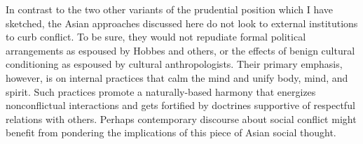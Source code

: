 In contrast to the two other variants of the prudential position which I have sketched, the Asian approaches discussed here do not look to external institutions to curb conflict. To be sure, they would not repudiate formal political arrangements as espoused by Hobbes and others, or the effects of benign cultural conditioning as espoused by cultural anthropologists. Their primary emphasis, however, is on internal practices that calm the mind and unify body, mind, and spirit. Such practices promote a naturally-based harmony that energizes nonconflictual interactions and gets fortified by doctrines supportive of respectful relations with others. Perhaps contemporary discourse about social conflict might benefit from pondering the implications of this piece of Asian social thought.